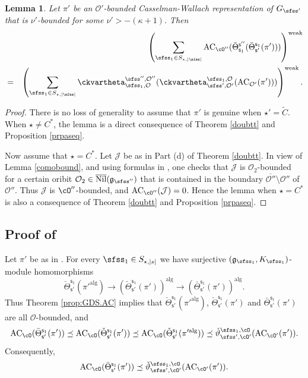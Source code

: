 \documentclass[11pt,a4paper]{amsart}
\def\abs#1{\left|{#1}\right|}
\newcommand{\CJ}{{\mathcal {J}}}
\newcommand{\CO}{{\mathcal {O}}}
\newcommand{\g}{\mathfrak g}
\newcommand{\be}{\begin {equation}}
\newcommand{\ee}{\end {equation}}
\numberwithin{equation}{section}
\newtheorem{lem}[thm]{Lemma}
\theoremstyle{remark}
\def\Nil{\overline{\mathrm{Nil}}}
\def\Thetab{\bar{\Theta}}
\begin{document}
\begin{lem}\label{lem:GDS.AC2}
  Let $\pi'$ be an $\CO'$-bounded Casselman-Wallach representation of $G_{\sfss'}$  that is  $\nu'$-bounded for some
$
  \nu'>
 -(\kappa+1).
$
Then
 \begin{eqnarray*}
  && \left( \sum_{\sfss_1\in S_{\star, \abs{\sfss}} } \mathrm{AC}_{\cO''}( \Thetab^{\mathsf s''}_{\mathsf s_1}(\Thetab_{\mathsf s'}^{\mathsf s_1}(\pi')))\right)^{\mathrm{weak}}
\\
&=& \left( \sum_{\sfss_1\in S_{\star, \abs{\sfss}}}   \ckvartheta^{\sfss'', \CO''}_{\sfss_1, \CO}(\ckvartheta^{\sfss_1, \CO}_{\sfss',\CO'}(\mathrm{AC}_{\CO'}(\pi')))\right)^{\mathrm{weak}}.
\end{eqnarray*}

\end{lem}

\begin{proof}
There is no loss of generality to assume that $\pi'$ is genuine when $\star'=\widetilde C$. When $\star\neq C^*$, the lemma is a direct consequence of Theorem \ref{doubtt} and Proposition \ref{prpaseq}.

Now assume that $\star=C^*$.  Let $\CJ$ be as in Part (d) of Theorem \ref{doubtt}. In view of Lemma \ref{comobound}, and using formulas in  \cite[Theorems 5.2 and 5.6]{DKPC}, one checks that $\CJ$ is $\CO_2$-bounded for a certain oribit $\CO_2\in \Nil(\g_{\sfss''})$ that is contained in the boundary $\overline{\CO''}\setminus \CO''$ of  $\CO''$. Thus
$\CJ$ is $\cO''$-bounded, and $ \mathrm{AC}_{\cO''}(\CJ)=0$. Hence  the  lemma when $\star=C^*$  is also a consequence of Theorem \ref{doubtt} and Proposition \ref{prpaseq}.
\end{proof}


\subsection{Proof of }
Let $\pi'$ be as in .
For every $\sfss_1\in S_{\star, \abs{s}}$ we have
surjective $(\g_{\sfss_1}, K_{\sfss_1})$-module homomorphisms
\[
\check \Theta_{\mathsf s'}^{\mathsf s_1}(\pi'^{\mathrm{alg}})\rightarrow \left (\check \Theta_{\mathsf s'}^{\mathsf s_1}(\pi')\right )^{\mathrm{alg}}\rightarrow
 \left (\Thetab_{\mathsf s'}^{\mathsf s_1}(\pi')\right )^{\mathrm{alg}}.
 \]
 Thus Theorem \ref{prop:GDS.AC} implies that  $\check \Theta_{\mathsf s'}^{\mathsf s_1}(\pi'^{\mathrm{alg}})$, $\check \Theta_{\mathsf s'}^{\mathsf s_1}(\pi')$ and $\Thetab_{\mathsf s'}^{\mathsf s_1}(\pi')$ are all $\CO$-bounded,  and
    \be\label{ineq000}
   \mathrm{AC}_{\cO}( \Thetab_{\mathsf s'}^{\mathsf s_1}(\pi'))\preceq  \mathrm{AC}_{\cO}(\check \Theta_{\mathsf s'}^{\mathsf s_1}(\pi'))\preceq  \mathrm{AC}_{\cO}(\check \Theta_{\mathsf s'}^{\mathsf s_1}(\pi'^{\mathrm{alg}}))\preceq \check \vartheta_{\sfss', \cO'}^{\sfss_1, \cO}(\mathrm{AC}_{\cO'}(\pi')).
  \ee
  Consequently,
   \be\label{acco}
   \mathrm{AC}_{\cO}( \Thetab_{\mathsf s'}^{\mathsf s_1}(\pi'))\preceq   \check \vartheta_{\sfss', \cO'}^{\sfss_1, \cO}(\mathrm{AC}_{\cO'}(\pi')).
  \ee
\end{document}
